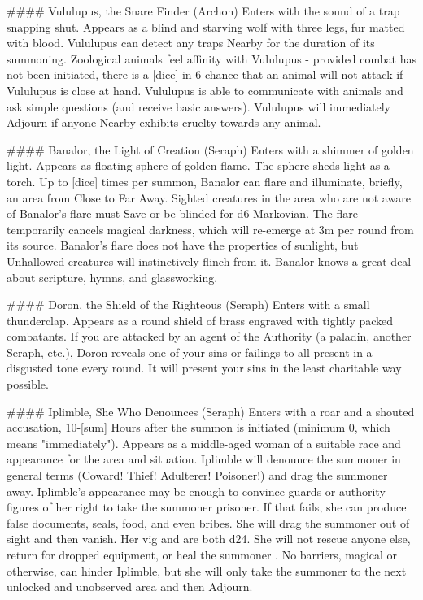 #### Vululupus, the Snare Finder (Archon)
Enters with the sound of a trap snapping shut. Appears as a blind and starving wolf with three legs, fur matted with blood.  Vululupus can detect any traps Nearby for the duration of its summoning.  Zoological animals feel affinity with Vululupus - provided combat has not been initiated, there is a [dice] in 6 chance that an animal will not attack if Vululupus is close at hand.  Vululupus is able to communicate with animals and ask simple questions (and receive basic answers).  Vululupus will immediately Adjourn if anyone Nearby exhibits cruelty towards any animal.

####  Banalor, the Light of Creation (Seraph)
Enters with a shimmer of golden light. Appears as floating sphere of golden flame. The sphere sheds light as a torch. Up to [dice] times per summon, Banalor can flare and illuminate, briefly, an area from Close to Far Away. Sighted creatures in the area who are not aware of Banalor's flare must Save or be blinded for d6 Markovian. The flare temporarily cancels magical darkness, which will re-emerge at 3m per round from its source. Banalor's flare does not have the properties of sunlight, but Unhallowed creatures will instinctively flinch from it. Banalor knows a great deal about scripture, hymns, and glassworking.


####  Doron, the Shield of the Righteous (Seraph)
Enters with a small thunderclap. Appears as a round shield of brass engraved with tightly packed combatants. If you are attacked by an agent of the Authority (a paladin, another Seraph, etc.), Doron reveals one of your sins or failings to all present in a disgusted tone every round.  It will present your sins in the least charitable way possible.



####  Iplimble, She Who Denounces (Seraph)
Enters with a roar and a shouted accusation, 10-[sum] Hours after the summon is initiated (minimum 0, which means "immediately"). Appears as a middle-aged woman of a suitable race and appearance for the area and situation. Iplimble will denounce the summoner in general terms (Coward! Thief! Adulterer! Poisoner!) and drag the summoner away. Iplimble's appearance may be enough to convince guards or authority figures of her right to take the summoner prisoner. If that fails, she can produce false documents, seals, food, and even bribes. She will drag the summoner out of sight and then vanish. Her {vig} and \MD are both d24. She will not rescue anyone else, return for dropped equipment, or heal the summoner . No barriers, magical or otherwise, can hinder Iplimble, but she will only take the summoner to the next unlocked and unobserved area and then Adjourn.


